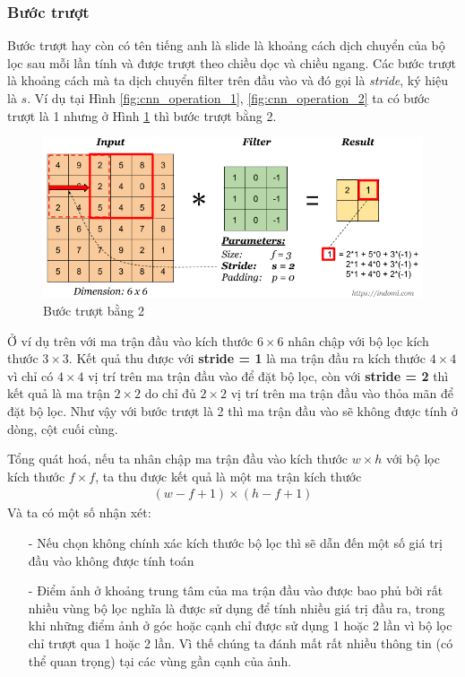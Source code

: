 \subsubsection{Bước trượt}
  Bước trượt hay còn có tên tiếng anh là slide là khoảng cách dịch chuyển của bộ lọc sau mỗi lần tính và được trượt theo chiều dọc và chiều ngang. Các bước trượt là khoảng cách mà ta dịch chuyển filter trên đầu vào và đó gọi là \textit{stride}, ký hiệu là $s$. Ví dụ tại Hình \ref{fig:cnn_operation_1}, \ref{fig:cnn_operation_2} ta có bước trượt là 1 nhưng ở Hình \ref{fig:stride} thì bước trượt bằng 2.
\begin{figure}[H]
	\begin{center}
		\includegraphics[scale=0.5]{chap3/image/cnn/stride/stride.png}
	\end{center}
	\caption{Bước trượt bằng 2 \protect \footnotemark}
	\label{fig:stride}
\end{figure}
Ở ví dụ trên với ma trận đầu vào kích thước $6\times 6$ nhân chập với bộ lọc kích thước $3\times 3$. Kết quả thu được với \textbf{stride = 1} là ma trận đầu ra kích thước $4\times 4$ vì chỉ có $4\times 4$ vị trí trên ma trận đầu vào để đặt bộ lọc, còn với \textbf{stride = 2} thì kết quả là ma trận $2\times 2$ do chỉ đủ $2\times 2$ vị trí trên ma trận đầu vào thỏa mãn để đặt bộ lọc. Như vậy với bước trượt là 2 thì ma trận đầu vào sẽ không được tính ở dòng, cột cuối cùng. \par
Tổng quát hoá, nếu ta nhân chập ma trận đầu vào kích thước $w\times h$ với bộ lọc kích thước  $f\times f$, ta thu được kết quả là một ma trận kích thước 
\begin{align}
(w - f + 1) \times (h - f + 1)
\end{align}
Và ta có một số nhận xét:
\begin{itemize}
\item[-] Nếu chọn không chính xác kích thước bộ lọc thì sẽ dẫn đến một số giá trị đầu vào không được tính toán
\item[-]Điểm ảnh ở khoảng trung tâm của ma trận đầu vào được bao phủ bởi rất nhiều vùng bộ lọc nghĩa là được sử dụng để tính nhiều giá trị đầu ra, trong khi những điểm ảnh ở góc hoặc cạnh chỉ được sử dụng 1 hoặc 2 lần vì bộ lọc chỉ trượt qua 1 hoặc 2 lần. Vì thế chúng ta đánh mất rất nhiều thông tin (có thể quan trọng) tại các vùng gần cạnh của ảnh.
\end{itemize}
